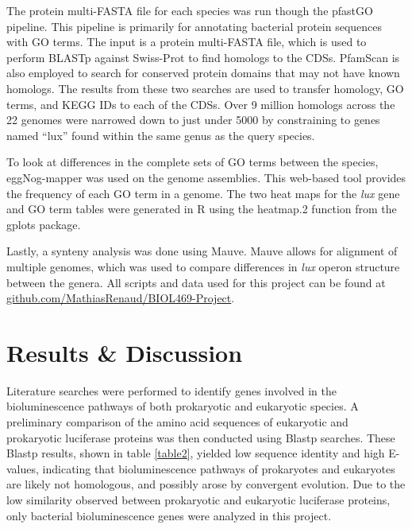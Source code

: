 \documentclass[fleqn,12pt]{wlscirep}
\begin{document}
	The protein multi-FASTA file for each species was run though the pfastGO pipeline. This pipeline is primarily for annotating bacterial protein sequences with GO terms. The input is a protein multi-FASTA file, which is used to perform BLASTp against Swiss-Prot to find homologs to the CDSs. PfamScan is also employed to search for conserved protein domains that may not have known homologs. The results from these two searches are used to transfer homology, GO terms, and KEGG IDs to each of the CDSs\cite{18}. Over 9 million homologs across the 22 genomes were narrowed down to just under 5000 by constraining to genes named “lux” found within the same genus as the query species.
    
	To look at differences in the complete sets of GO terms between the species, eggNog-mapper was used on the genome assemblies. This web-based tool provides the frequency of each GO term in a genome\cite{19}. The two heat maps for the \textit{lux} gene and GO term tables were generated in R using the heatmap.2 function from the gplots package.
    
	Lastly, a synteny analysis was done using Mauve. Mauve allows for alignment of multiple genomes, which was used to compare differences in \textit{lux} operon structure between the genera\cite{20}. All scripts and data used for this project can be found at \url{github.com/MathiasRenaud/BIOL469-Project}.


\section*{Results \& Discussion}

Literature searches were performed to identify genes involved in the bioluminescence pathways of both prokaryotic and eukaryotic species. A preliminary comparison of the amino acid sequences of eukaryotic and prokaryotic luciferase proteins was then conducted using Blastp searches. These Blastp results, shown in table \ref{table2}, yielded low sequence identity and high E-values, indicating that bioluminescence pathways of prokaryotes and eukaryotes are likely not homologous, and possibly arose by convergent evolution. Due to the low similarity observed between prokaryotic and eukaryotic luciferase proteins, only bacterial bioluminescence genes were analyzed in this project.\\
\end{document}
